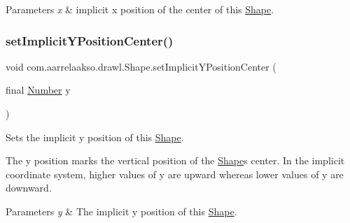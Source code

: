 \begin{DoxyParams}{Parameters}
{\em x} & implicit x position of the center of this \hyperlink{classcom_1_1aarrelaakso_1_1drawl_1_1_shape}{Shape}. \\
\hline
\end{DoxyParams}
\mbox{\label{classcom_1_1aarrelaakso_1_1drawl_1_1_shape_a79c79420c626b8b2d2534b6c9aa64d8f}} 
\subsubsection{\texorpdfstring{set\+Implicit\+Y\+Position\+Center()}{setImplicitYPositionCenter()}}
{\footnotesize\ttfamily void com.\+aarrelaakso.\+drawl.\+Shape.\+set\+Implicit\+Y\+Position\+Center (\begin{DoxyParamCaption}\item[{final \hyperlink{interfacecom_1_1aarrelaakso_1_1drawl_1_1_number}{Number}}]{y }\end{DoxyParamCaption})\hspace{0.3cm}{\ttfamily [protected]}}



Sets the implicit y position of this \hyperlink{classcom_1_1aarrelaakso_1_1drawl_1_1_shape}{Shape}. 

The y position marks the vertical position of the \hyperlink{classcom_1_1aarrelaakso_1_1drawl_1_1_shape}{Shape}\textquotesingle{}s center. In the implicit coordinate system, higher values of y are upward whereas lower values of y are downward.


\begin{DoxyParams}{Parameters}
{\em y} & The implicit y position of this \hyperlink{classcom_1_1aarrelaakso_1_1drawl_1_1_shape}{Shape}. \\
\hline
\end{DoxyParams}
\mbox{\label{classcom_1_1aarrelaakso_1_1drawl_1_1_shape_a0aef56392d76202235a9520394e87492}} 
